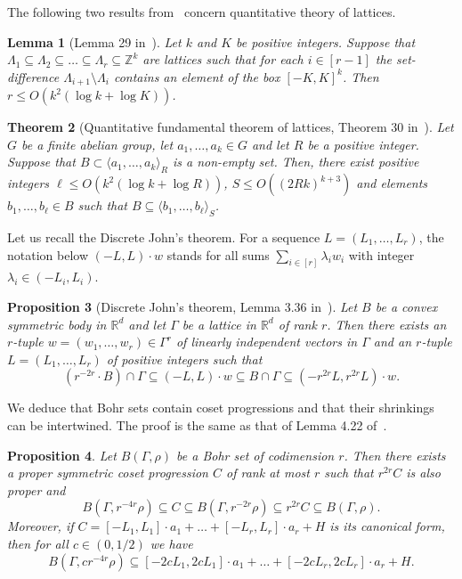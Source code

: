 \documentclass[a4paper,11pt]{article}
\newtheorem{theorem}{Theorem}
\numberwithin{theorem}{section}
\newtheorem{lemma}[theorem]{Lemma}
\newtheorem{proposition}[theorem]{Proposition}
\theoremstyle{definition}
\begin{document}
The following two results from~\cite{generalBilBog} concern quantitative theory of lattices.

\begin{lemma}[Lemma 29 in~\cite{generalBilBog}]\label{nestedLattices}Let $k$ and $K$ be positive integers. Suppose that $\Lambda_1 \subseteq \Lambda_2 \subseteq \dots \subseteq \Lambda_r \subseteq \mathbb{Z}^k$ are lattices such that for each $i \in [r-1]$ the set-difference $\Lambda_{i + 1} \setminus \Lambda_i$ contains an element of the box $[-K, K]^k$. Then $r \leq O(k^2 (\log k + \log K))$.\end{lemma}

\begin{theorem}[Quantitative fundamental theorem of lattices, Theorem 30 in~\cite{generalBilBog}]\label{quantLattice}Let $G$ be a finite abelian group, let $a_1, \dots, a_k \in G$ and let $R$ be a positive integer. Suppose that $B \subset \langle a_1, \dots, a_k \rangle_R$ is a non-empty set. Then, there exist positive integers $\ell \leq O(k^2 (\log k + \log R))$, $S \leq O((2Rk)^{k+ 3})$ and elements $b_1, \dots, b_\ell \in B$ such that $B \subseteq \langle b_1, \dots, b_\ell\rangle_{S}$.\end{theorem}

Let us recall the Discrete John's theorem. For a sequence $L = (L_1, \dots, L_r)$, the notation below $(-L, L) \cdot w$ stands for all sums $\sum_{i \in [r]} \lambda_i w_i$ with integer $\lambda_i \in (-L_i, L_i)$.

\begin{proposition}[Discrete John's theorem, Lemma 3.36 in~\cite{TaoVuBook}]\label{discJohn}
    Let $B$ be a convex symmetric body in $\mathbb{R}^d$ and let $\Gamma$ be a lattice in $\mathbb{R}^d$ of rank $r$. Then there exists an $r$-tuple $w = (w_1, \dots, w_r) \in \Gamma^r$ of linearly independent vectors in $\Gamma$ and an $r$-tuple $L = (L_1, \dots, L_r)$ of positive integers such that
    \[(r^{-2r} \cdot B) \cap \Gamma \subseteq (-L, L) \cdot w \subseteq B \cap \Gamma \subseteq (-r^{2r} L, r^{2r} L) \cdot w.\]
\end{proposition}

We deduce that Bohr sets contain coset progressions and that their shrinkings can be intertwined. The proof is the same as that of Lemma 4.22 of~\cite{TaoVuBook}. 

\begin{proposition}\label{cpsinbohrsets}
    Let $B(\Gamma, \rho)$ be a Bohr set of codimension $r$. Then there exists a proper symmetric coset progression $C$ of rank at most $r$ such that $r^{2r} C$ is also proper and
    \[B(\Gamma, r^{-4r} \rho) \subseteq C \subseteq B(\Gamma, r^{-2r} \rho)  \subseteq r^{2r} C \subseteq B(\Gamma, \rho).\]
    Moreover, if $C = [-L_1, L_1] \cdot a_1 + \dots + [-L_r, L_r] \cdot a_r + H$ is its canonical form, then for all $c \in (0,1/2)$ we have
    \[B(\Gamma, cr^{-4r} \rho) \subseteq [-2c L_1, 2cL_1] \cdot a_1 + \dots +[-2cL_r, 2cL_r] \cdot a_r + H.\]
\end{proposition}
\end{document}
